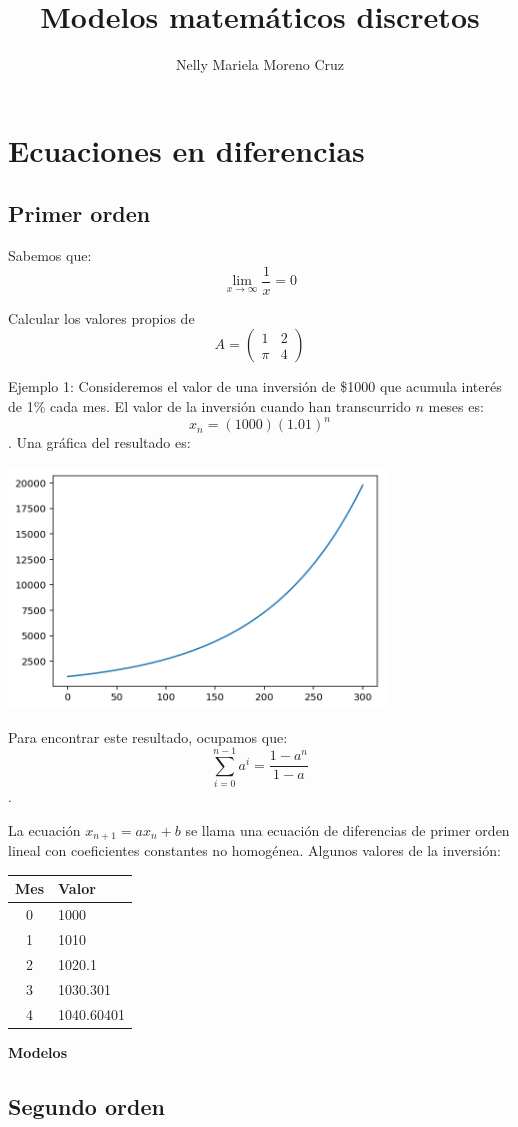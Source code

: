 \documentclass{article}
\title{Modelos matemáticos discretos}
\author{Nelly Mariela Moreno Cruz}
\begin{document}
\maketitle
\section{Ecuaciones en diferencias}
\subsection{Primer orden}
Sabemos que: $$\lim_{x\to\infty}\frac{1}{x}=0$$

Calcular los valores propios de $$A=
\begin{pmatrix}
1 & 2\\
\pi & 4
\end{pmatrix}
$$



Ejemplo 1:
Consideremos el valor de una inversión de \$1000 que acumula interés de 1\% cada mes.
El valor de la inversión cuando han transcurrido $n$ meses es: $$x_n=(1000)(1.01)^n$$.
Una gráfica del resultado es:

\begin{center}
\includegraphics[width=10cm]{graficaa}
\end{center}

Para encontrar este resultado, ocupamos que:
$$\sum_{i=0}^{n-1}a^i=\frac{1-a^{n}}{1-a}$$.

La ecuación $x_{n+1}=ax_n+b$ se llama una ecuación de diferencias de primer orden lineal con coeficientes constantes no homogénea.
Algunos valores de la inversión:

\begin{center}
\begin{tabular}{|c|l|}
\hline
Mes & Valor\\
\hline
0 & 1000\\
\hline
1 & 1010\\
\hline
2 & 1020.1\\
\hline
3 & 1030.301\\
\hline
4 & 1040.60401\\
\hline
\end{tabular}
\end{center}

\begin{center}
\huge
\textbf{Modelos}
\end{center}

\subsection{Segundo orden}
\end{document}
